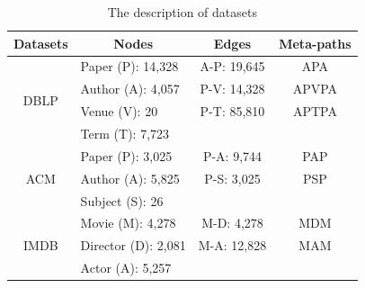 \documentclass[letterpaper]{article} %
\begin{document}
\begin{table}[t]
\centering
\small
\renewcommand{\arraystretch}{1.3}
\begin{tabular}{c|l|c|c}
\hline
\textbf{Datasets} & \multicolumn{1}{c|}{\textbf{Nodes}} & \multicolumn{1}{c|}{\textbf{Edges}} & \textbf{Meta-paths} \\ \hline
\multirow[c]{4}{*}{DBLP} 
 & Paper (P): 14,328        & A-P: 19,645          & APA        \\
 & Author (A): 4,057        & P-V: 14,328          & APVPA      \\
 & Venue (V): 20            & P-T: 85,810          & APTPA      \\
 & Term (T): 7,723          &                      &            \\ \hline
\multirow[c]{3}{*}{ACM}  
 & Paper (P): 3,025         & P-A: 9,744           & PAP        \\
 & Author (A): 5,825        & P-S: 3,025           & PSP        \\
 & Subject (S): 26          &                      &            \\ \hline
\multirow[c]{3}{*}{IMDB} 
 & Movie (M): 4,278         & M-D: 4,278           & MDM        \\
 & Director (D): 2,081      & M-A: 12,828          & MAM        \\
 & Actor (A): 5,257         &                      &            \\ \hline
\end{tabular}
\caption{The description of datasets}
\label{tab1}
\end{table}
\end{document}

